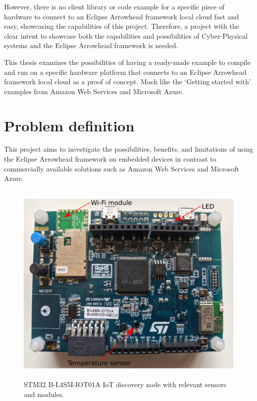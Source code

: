 However, there is no client library or code example for a specific piece of hardware to connect to an Eclipse Arrowhead framework local cloud fast and easy, showcasing the capabilities of this project. 
Therefore, a project with the clear intent to showcase both the capabilities and possibilities of Cyber-Physical systems and the Eclipse Arrowhead framework is needed.

This thesis examines the possibilities of having a ready-made example to compile and run on a specific hardware platform that connects to an Eclipse Arrowhead framework local cloud as a proof of concept. 
Much like the ‘Getting started with’ examples from Amazon Web Services and Microsoft Azure.\cite{Guide2020,AZURE2021}
\section{Problem definition}
This project aims to investigate the possibilities, benefits, and limitations of using the Eclipse Arrowhead framework on embedded devices in contrast to commercially available solutions such
as Amazon Web Services and Microsoft Azure. 
\begin{figure}[h!]
    \centering
    \includegraphics[width=\textwidth, height=10cm]{Pictures/board.pdf} 
    \caption{STM32 B-L4S5I-IOT01A IoT discovery node with relevant sensors and modules.}
    \label{STM32 B-L4S5I-IOT01A IoT discovery node}
\end{figure}
\newpage

